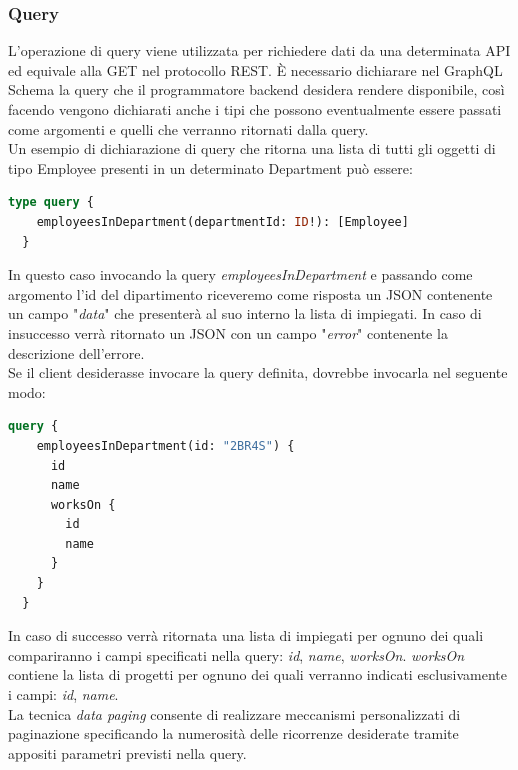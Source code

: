 \subsubsection{Query}
L'operazione di query viene utilizzata per richiedere dati da una determinata API ed equivale alla GET nel protocollo REST. È necessario dichiarare nel GraphQL Schema la query che il programmatore backend desidera rendere disponibile, così facendo vengono dichiarati anche i tipi che possono eventualmente essere passati come argomenti e quelli che verranno ritornati dalla query.\\
Un esempio di dichiarazione di query che ritorna una lista di tutti gli oggetti di tipo Employee presenti in un determinato Department può essere:
\begin{lstlisting}[language=GraphQL,]
  type query {
    employeesInDepartment(departmentId: ID!): [Employee]
  }
\end{lstlisting}
In questo caso invocando la query \textit{employeesInDepartment} e passando come argomento l'id del dipartimento riceveremo come risposta un JSON contenente un campo "\textit{data}" che presenterà al suo interno la lista di impiegati. In caso di insuccesso verrà ritornato un JSON con un campo "\textit{error}" contenente la descrizione dell'errore.\\
Se il client desiderasse invocare la query definita, dovrebbe invocarla nel seguente modo:
\begin{lstlisting}[language=GraphQL,]
  query {
    employeesInDepartment(id: "2BR4S") {
      id
      name
      worksOn {
        id
        name
      }
    }
  }
\end{lstlisting}
In caso di successo verrà ritornata una lista di impiegati per ognuno dei quali compariranno i campi specificati nella query: \textit{id}, \textit{name}, \textit{worksOn}. \textit{worksOn} contiene la lista di progetti per ognuno dei quali verranno indicati esclusivamente i campi: \textit{id}, \textit{name}.\\
La tecnica \textit{data paging} consente di realizzare meccanismi personalizzati di paginazione specificando la numerosità delle ricorrenze desiderate tramite appositi parametri previsti nella query.
